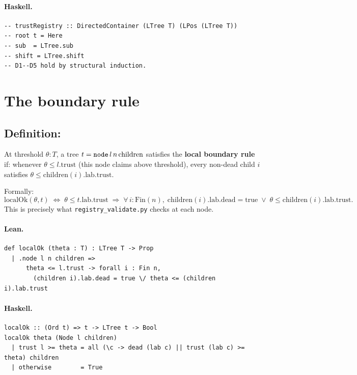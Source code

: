 \documentclass[11pt,a4paper]{article}
\begin{document}
\paragraph{Haskell.}
\begin{lstlisting}[style=haskell]
-- trustRegistry :: DirectedContainer (LTree T) (LPos (LTree T))
-- root t = Here
-- sub  = LTree.sub
-- shift = LTree.shift
-- D1--D5 hold by structural induction.
\end{lstlisting}

\section{The boundary rule}

\subsection{Definition: }

\begin{defn}
At threshold $\theta : T$, a tree $t = \texttt{node}\,l\,n\,\mathrm{children}$
satisfies the \textbf{local boundary rule} if: whenever $\theta \le l.\mathrm{trust}$
(this node claims above threshold), every non-dead child $i$ satisfies
$\theta \le \mathrm{children}(i).\mathrm{lab}.\mathrm{trust}$.

Formally:
\[
  \mathrm{localOk}(\theta, t) \;\iff\;
  \theta \le t.\mathrm{lab}.\mathrm{trust} \;\Rightarrow\;
  \forall\, i : \mathrm{Fin}(n),\;
  \mathrm{children}(i).\mathrm{lab}.\mathrm{dead} = \mathrm{true}
  \;\vee\; \theta \le \mathrm{children}(i).\mathrm{lab}.\mathrm{trust}.
\]
This is precisely what \texttt{registry\_validate.py} checks at each node.
\end{defn}

\paragraph{Lean.}
\begin{lstlisting}[style=lean]
def localOk (theta : T) : LTree T -> Prop
  | .node l n children =>
      theta <= l.trust -> forall i : Fin n,
        (children i).lab.dead = true \/ theta <= (children i).lab.trust
\end{lstlisting}

\paragraph{Haskell.}
\begin{lstlisting}[style=haskell]
localOk :: (Ord t) => t -> LTree t -> Bool
localOk theta (Node l children)
  | trust l >= theta = all (\c -> dead (lab c) || trust (lab c) >= theta) children
  | otherwise        = True
\end{lstlisting}
\end{document}
